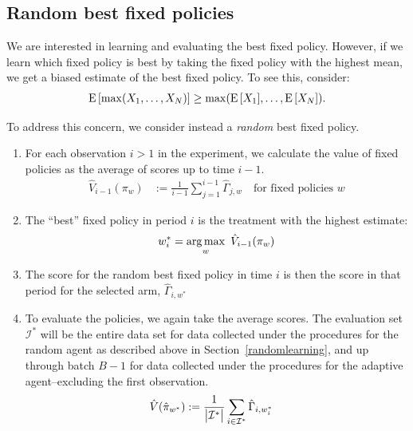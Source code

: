 \documentclass[letterpaper, 12pt, parskip=full,]{scrartcl}
\begin{document}
\subsection{Random best fixed policies}\label{appendix:bestfixed}
We are interested in learning and evaluating the best fixed policy. However, if we learn which fixed policy is best by taking the fixed policy with the highest mean, we get a biased estimate of the best fixed policy. To see this, consider:
\begin{align*}
{\textrm E}\,[\max(X_1, \dots, X_N)] \ge \max({\textrm E}\,[X_1],\dots, {\textrm E}\,[X_N]). 
\end{align*}

To address this concern, we consider instead a \textit{random} best fixed policy. 
\begin{enumerate}
\item For each observation $i>1$ in the experiment, we calculate the value of fixed policies as the average of scores up to time $i-1$. 
\begin{align*}
\hat{V}_{i-1}({\pi}_{w})  &:= \frac{1}{i-1 } \sum_{j = 1 }^{i-1} \hat{\Gamma}_{j,w} \quad \text{for fixed policies $w$}
\end{align*}
\item The ``best'' fixed policy in period $i$ is the treatment with the highest estimate:
\begin{align*}
w_i^* =  \operatorname*{arg\,max}_w \ \hat{V}_{i-1}({\pi}_{w})
\end{align*}
\item The score for the random best fixed policy in time $i$ is then the score in that period for the selected arm, $\hat{\Gamma}_{i, w^*}$ 
 \item To evaluate the policies, we again take the average scores. The evaluation set $\mathcal{I}^*$ will be the entire data set for data collected under the procedures for the random agent as described above in Section~\ref{randomlearning}, and up through batch $B-1$ for data collected under the procedures for the adaptive agent--excluding the first observation. 
    \begin{align*}
          \hat{V}(\hat{\pi}_{w^*})  &:= \frac{1}{\big{\lvert} \mathcal{I}^* \big{\rvert}} \sum_{i \in \mathcal{I}^* } 
          \hat{\Gamma}_{i, w_i^*} 
  \end{align*}
\end{enumerate}
\end{document}
